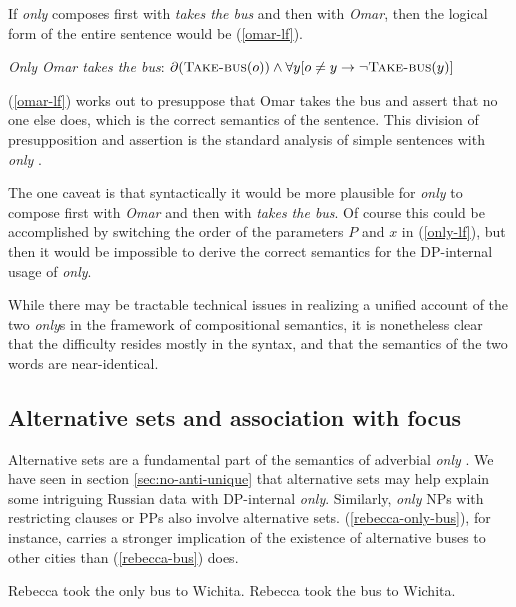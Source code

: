 If \textit{only} composes first with \textit{takes the bus} and then with \textit{Omar}, then the logical form of the entire sentence would be (\ref{omar-lf}).

\begin{exe}
	\ex \label{omar-lf} \textit{Only Omar takes the bus}: $\partial(\textsc{Take-bus}(o)) \land \forall y [ o \ne y \to \neg \textsc{Take-bus}(y) ]$
\end{exe}

(\ref{omar-lf}) works out to presuppose that Omar takes the bus and assert that no one else does, which is the correct semantics of the sentence. This division of presupposition and assertion is the standard analysis of simple sentences with \textit{only} \citep{horn69}.

The one caveat is that syntactically it would be more plausible for \textit{only} to compose first with \textit{Omar} and then with \textit{takes the bus}. Of course this could be accomplished by switching the order of the parameters $P$ and $x$ in (\ref{only-lf}), but then it would be impossible to derive the correct semantics for the DP-internal usage of \textit{only}.

While there may be tractable technical issues in realizing a unified account of the two \textit{only}s in the framework of compositional semantics, it is nonetheless clear that the difficulty resides mostly in the syntax, and that the semantics of the two words are near-identical.


\subsection{Alternative sets and association with focus}
Alternative sets are a fundamental part of the semantics of adverbial \textit{only} \citep{rooth85, rooth92}. We have seen in section \ref{sec:no-anti-unique} that alternative sets may help explain some intriguing Russian data with DP-internal \textit{only}. Similarly, \textit{only} NPs with restricting clauses or PPs also involve alternative sets. (\ref{rebecca-only-bus}), for instance, carries a stronger implication of the existence of alternative buses to other cities than (\ref{rebecca-bus}) does.

\begin{exe}
	\ex \label{rebecca-only-bus} Rebecca took the only bus to Wichita.
	\ex \label{rebecca-bus} Rebecca took the bus to Wichita.
\end{exe}

